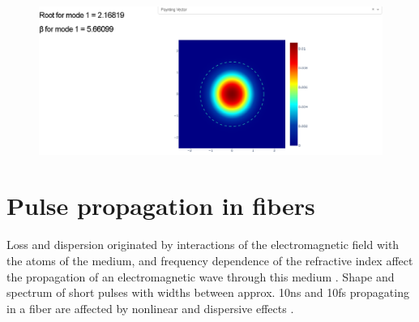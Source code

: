         \begin{figure}[label={fig:fibre2}, caption={\href{https://fiber-mode-app.herokuapp.com/apps/results}{Heroku app} for the optical fiber (2).}]
        	\includegraphics[width=.8\textwidth]{figures/chap2/fibre2.PNG} 
        \end{figure}
    

   


\section{Pulse propagation in fibers}

Loss and dispersion originated by interactions of the electromagnetic field with the atoms of the medium, and frequency dependence of the refractive index affect the propagation of an electromagnetic wave through this medium \citep{dudley_taylor_2010}. Shape and spectrum of short pulses with widths between approx. 10ns and 10fs propagating in a fiber are affected by nonlinear and dispersive effects \citep{AgrawalBook}.  

